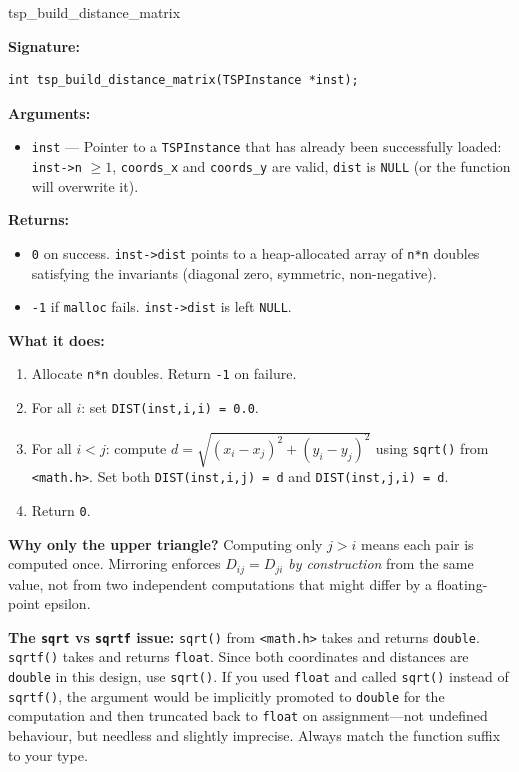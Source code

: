\begin{apispec}{tsp\_build\_distance\_matrix}

\textbf{Signature:}
\begin{lstlisting}[style=cstyle, numbers=none]
int tsp_build_distance_matrix(TSPInstance *inst);
\end{lstlisting}

\textbf{Arguments:}
\begin{itemize}
  \item \texttt{inst} --- Pointer to a \texttt{TSPInstance} that has already been successfully loaded: \texttt{inst->n} $\geq 1$, \texttt{coords\_x} and \texttt{coords\_y} are valid, \texttt{dist} is \texttt{NULL} (or the function will overwrite it).
\end{itemize}

\textbf{Returns:}
\begin{itemize}
  \item \texttt{0} on success. \texttt{inst->dist} points to a heap-allocated array of \texttt{n*n} doubles satisfying the invariants (diagonal zero, symmetric, non-negative).
  \item \texttt{-1} if \texttt{malloc} fails. \texttt{inst->dist} is left \texttt{NULL}.
\end{itemize}

\textbf{What it does:}
\begin{enumerate}[label=\arabic*.]
  \item Allocate \texttt{n*n} doubles. Return \texttt{-1} on failure.
  \item For all $i$: set \texttt{DIST(inst,i,i) = 0.0}.
  \item For all $i < j$: compute $d = \sqrt{(x_i - x_j)^2 + (y_i - y_j)^2}$ using \texttt{sqrt()} from \texttt{<math.h>}. Set both \texttt{DIST(inst,i,j) = d} and \texttt{DIST(inst,j,i) = d}.
  \item Return \texttt{0}.
\end{enumerate}

\textbf{Why only the upper triangle?} Computing only $j > i$ means each pair is computed once. Mirroring enforces $D_{ij} = D_{ji}$ \emph{by construction} from the same value, not from two independent computations that might differ by a floating-point epsilon.

\textbf{The \texttt{sqrt} vs \texttt{sqrtf} issue:} \texttt{sqrt()} from \texttt{<math.h>} takes and returns \texttt{double}. \texttt{sqrtf()} takes and returns \texttt{float}. Since both coordinates and distances are \texttt{double} in this design, use \texttt{sqrt()}. If you used \texttt{float} and called \texttt{sqrt()} instead of \texttt{sqrtf()}, the argument would be implicitly promoted to \texttt{double} for the computation and then truncated back to \texttt{float} on assignment---not undefined behaviour, but needless and slightly imprecise. Always match the function suffix to your type.

\end{apispec}

\newpage
